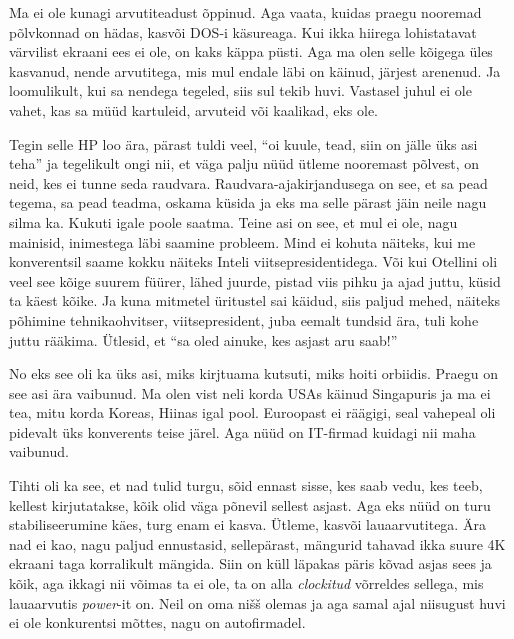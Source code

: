 Ma  ei ole kunagi arvutiteadust õppinud. Aga vaata, kuidas praegu nooremad põlvkonnad on hädas, kasvõi DOS-i käsureaga. Kui ikka hiirega lohistatavat värvilist ekraani ees ei ole, on kaks käppa püsti. Aga ma olen selle kõigega üles kasvanud, nende arvutitega, mis mul endale läbi on käinud, järjest arenenud. Ja loomulikult, kui sa nendega tegeled, siis sul tekib huvi. Vastasel juhul ei ole vahet, kas sa müüd kartuleid, arvuteid või kaalikad, eks ole. 

Tegin selle HP loo ära, pärast tuldi veel, \enquote{oi kuule, tead, siin on jälle üks asi teha} ja tegelikult ongi nii, et väga palju nüüd ütleme nooremast põlvest, on neid, kes ei tunne seda raudvara. Raudvara-ajakirjandusega on see, et sa pead tegema, sa pead teadma, oskama küsida ja eks ma selle pärast jäin neile nagu silma ka. Kukuti igale poole saatma. Teine asi on see, et mul ei ole, nagu mainisid, inimestega läbi saamine probleem. Mind ei  kohuta  näiteks, kui me konverentsil saame kokku näiteks Inteli viitsepresidentidega. Või kui Otellini  oli veel see kõige suurem füürer, lähed juurde, pistad viis pihku ja ajad  juttu, küsid ta käest kõike. Ja kuna mitmetel üritustel sai käidud, siis paljud mehed, näiteks põhimine tehnikaohvitser, viitsepresident, juba eemalt tundsid ära,  tuli kohe juttu rääkima. Ütlesid, et \enquote{sa oled ainuke, kes asjast aru saab!}

No eks see oli ka üks asi, miks kirjtuama kutsuti, miks hoiti orbiidis. Praegu on see asi ära vaibunud. Ma olen vist neli korda USAs käinud Singapuris ja ma ei tea, mitu korda Koreas, Hiinas igal pool. Euroopast ei räägigi, seal vahepeal oli pidevalt üks konverents teise järel. Aga nüüd on  IT-firmad kuidagi nii maha vaibunud. 
                 

Tihti oli ka see, et nad tulid turgu, sõid ennast sisse, kes saab vedu, kes teeb, kellest kirjutatakse, kõik olid väga põnevil sellest asjast. Aga eks nüüd on turu stabiliseerumine  käes, turg enam ei kasva. Ütleme, kasvõi lauaarvutitega. Ära nad ei kao, nagu paljud ennustasid, sellepärast, mängurid tahavad ikka suure 4K ekraani taga korralikult mängida. Siin on küll läpakas päris kõvad asjas sees ja kõik, aga ikkagi nii võimas ta ei ole, ta on alla \emph{clockitud} võrreldes sellega, mis lauaarvutis \emph{power}-it on. Neil on oma nišš olemas ja aga samal ajal niisugust huvi ei ole konkurentsi mõttes, nagu on autofirmadel.
                 
